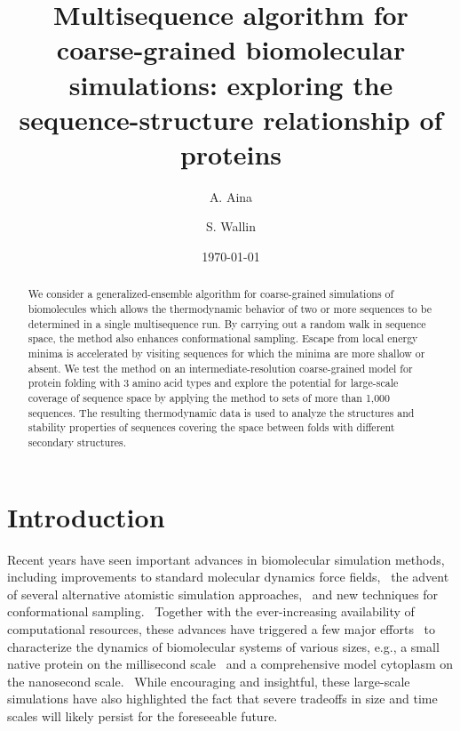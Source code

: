 \documentclass[
aip,
rsi,%
amsmath,amssymb,
reprint,%
]{revtex4-1}
\begin{document}

\title[Multisequence Monte Carlo simulations]{Multisequence algorithm for coarse-grained biomolecular simulations: exploring the sequence-structure relationship of proteins}

\author{A. Aina}
\author{S. Wallin}

\date{\today}

\begin{abstract}
We consider a generalized-ensemble algorithm for coarse-grained simulations of biomolecules which allows the thermodynamic behavior of two or more sequences to be determined in a single multisequence run. By carrying out a random walk in sequence space, the method also enhances conformational sampling. Escape from local energy minima is accelerated by visiting sequences for which the minima are more shallow or absent. We test the method on an intermediate-resolution coarse-grained model for protein folding with 3 amino acid types and explore the potential for large-scale coverage of sequence space by applying the method to sets of more than 1,000 sequences. The resulting thermodynamic data is used to analyze the structures and stability properties of sequences covering the space between folds with different secondary structures. 
\end{abstract}

                             

\maketitle

\section{Introduction}
\noindent
Recent years have seen important advances in biomolecular simulation methods, including improvements to standard molecular dynamics force fields,~\cite{Piana2014} the advent of several alternative atomistic simulation approaches,~\cite{Ding2008,Irback2006,Verma2009,Yang2007} and new techniques for  conformational sampling.~\cite{Bernardi2015} Together with the ever-increasing availability of computational resources, these advances have triggered a few major efforts~\cite{McGuffee2010,Miao2010,Perilla2016,Lindorff-Larsen2011,Yu2016} to characterize the dynamics of biomolecular systems of various sizes, e.g., a small native protein on the millisecond scale~\cite{Lindorff-Larsen2011} and a comprehensive model cytoplasm on the nanosecond scale.~\cite{Yu2016} While encouraging and insightful, these large-scale simulations have also highlighted the fact that severe tradeoffs in size and time scales will likely persist for the foreseeable future. 
\end{document}

